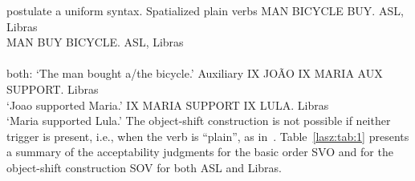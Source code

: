 \documentclass[output=paper,colorlinks,citecolor=brown,
]{langscibook}
\begin{document}
postulate a uniform syntax.
\ea 
    \label{lasz:ex:5}
    Spatialized plain verbs
    \ea 
        MAN BICYCLE BUY. 
        \hfill 
        \cmark ASL, \cmark Libras \\ 
        \citep[from][9]{Quadros.etal.2004}
    \ex 
        MAN BUY BICYCLE. 
        \hfill 
        \cmark ASL, \cmark Libras \\ 
        \citep[from][9]{Quadros.etal.2004} \\ 
        both: `The man bought a/the bicycle.'
    \z 
\ex 
    \label{lasz:ex:6}
    Auxiliary 
    \ea 
        IX JOÃO IX MARIA AUX SUPPORT. 
        \hfill 
        \cmark Libras 
        \\ 
        `Joao supported Maria.'
        \citep[from][7]{Quadros.etal.2004} 
    \ex 
        IX MARIA SUPPORT IX LULA. 
        \hfill 
        \cmark Libras 
        \\ 
        `Maria supported Lula.' 
        \citep[from][5]{Quadros.etal.2004}
    \z 
\z 
The object-shift construction is not possible if neither trigger is
present, i.e., when the verb is ``plain'', as in~.
\ea 
    \label{lasz:ex:7}
    \z 
\z 
Table~\ref{lasz:tab:1} presents a summary of the acceptability judgments for the
basic order SVO and for the object-shift construction SOV for both
ASL and Libras.
\end{document}
